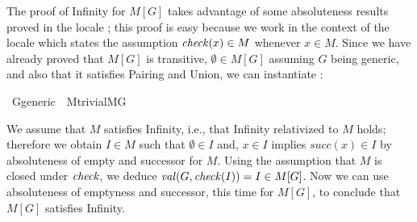 The proof of Infinity for $M[G]$ takes advantage of some absoluteness
results proved in the locale ; this
proof is easy because we work in the context of the locale
 which states
the assumption $\operatorname{\mathit{check}}(x) \in M$ whenever $x\in M$. Since we have
already proved that $M[G]$ is transitive, $\emptyset\in M[G]$ assuming
$G$ being generic, and also that it satisfies Pairing and Union, we
can instantiate :
\begin{isabelle}
\isamarkupfalse%
\ G{\isacharunderscore}generic\ {\isasymsubseteq}\ M{\isacharunderscore}trivial{\isachardoublequoteopen}{\isacharhash}{\isacharhash}M{\isacharbrackleft}G{\isacharbrackright}{\isachardoublequoteclose}
\end{isabelle}
We assume that $M$ satisfies Infinity, i.e., that Infinity relativized
to $M$ holds; therefore we obtain $I \in M$ such that $\emptyset\in I$
and, $x \in I$ implies $\mathit{succ}(x)\in I$ by absoluteness of
empty and successor for $M$. Using the assumption that $M$ is closed
under $\operatorname{\mathit{check}}$, we deduce $\operatorname{\mathit{val}}(G,\operatorname{\mathit{check}}(I)) = I \in M[G]$.  Now we can
use absoluteness of emptyness and successor, this time for $M[G]$, to
conclude that $M[G]$ satisfies Infinity.

